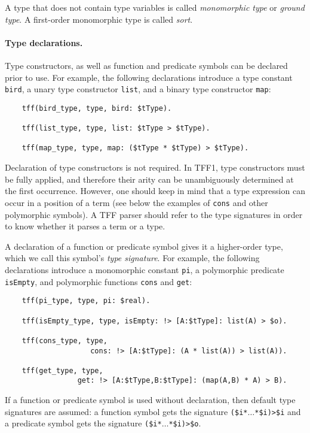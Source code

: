 A type that does not contain type variables is called
{\em monomorphic type\/} or {\em ground type}.
A first-order monomorphic type is called {\em sort}.

\paragraph{Type declarations.} Type constructors, as well as
function and predicate symbols can be declared prior to use.
For example, the following declarations introduce a type
constant {\tt bird}, a unary type constructor {\tt list},
and a binary type constructor {\tt map}:
\begin{verbatim}
    tff(bird_type, type, bird: $tType).

    tff(list_type, type, list: $tType > $tType).

    tff(map_type, type, map: ($tType * $tType) > $tType).
\end{verbatim}
Declaration of type constructors is not required. In TFF1,
type constructors must be fully applied, and therefore
their arity can be unambiguously determined at the first
occurrence. However, one should keep in mind that a type
expression can occur in a position of a term (see below
the examples of {\tt cons} and other polymorphic symbols).
A TFF parser should refer to the type signatures in order
to know whether it parses a term or a type.

A declaration of a function or predicate symbol gives it
a higher-order type, which we call this symbol's
{\em type signature}. For example, the following
declarations introduce a monomorphic constant {\tt pi},
a polymorphic predicate {\tt isEmpty}, and polymorphic
functions {\tt cons} and {\tt get}:
\begin{verbatim}
    tff(pi_type, type, pi: $real).

    tff(isEmpty_type, type, isEmpty: !> [A:$tType]: list(A) > $o).

    tff(cons_type, type,
                    cons: !> [A:$tType]: (A * list(A)) > list(A)).

    tff(get_type, type,
                 get: !> [A:$tType,B:$tType]: (map(A,B) * A) > B).
\end{verbatim}
If a function or predicate symbol is used without declaration,
then default type signatures are assumed:
a function symbol gets the signature
{\tt (\$i\;*\;$\dots$\;*\;\$i)\;>\;\$i} and
a predicate symbol gets the signature
{\tt (\$i\;*\;$\dots$\;*\;\$i)\;>\;\$o}.


